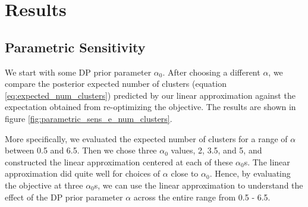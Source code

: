 \documentclass[a4paper]{article}
\begin{document}
\section{Results}

\subsection{Parametric Sensitivity}
We start with some DP prior parameter $\alpha_0$. After choosing a different $\alpha$,
we compare the posterior expected number of clusters (equation \ref{eq:expected_num_clusters})
predicted by our linear approximation against the
expectation obtained from re-optimizing the objective. The results are shown in figure
\ref{fig:parametric_sens_e_num_clusters}.

More specifically, we evaluated the expected number of clusters for a range of
$\alpha$ between 0.5 and 6.5.
Then we chose three $\alpha_0$ values, 2, 3.5, and 5, and constructed the linear approximation
centered at each of these $\alpha_0$s. The linear approximation did quite well for choices of $\alpha$
close to $\alpha_0$. Hence, by evaluating the objective at three $\alpha_0$s, we can use
the linear approximation to understand the effect of the DP prior parameter $\alpha$ across the entire
range from 0.5 - 6.5.
\end{document}
